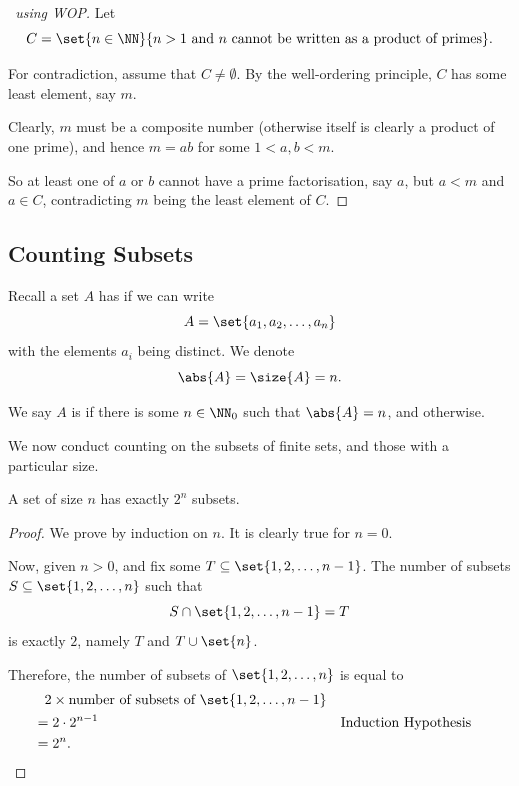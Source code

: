 \begin{proof}[\proofname\ using WOP]
    Let
    \[
        C = \set{n \in \NN}{n > 1 \text{ and } n \text{ cannot be written as a product of primes}}.
    \]

    For contradiction, assume that \(C \neq \emptyset\). By the well-ordering principle, \(C\) has some least element, say \(m\).

    Clearly, \(m\) must be a composite number (otherwise itself is clearly a product of one prime), and hence \(m = ab\) for some \(1 < a, b < m\).

    So at least one of \(a\) or \(b\) cannot have a prime factorisation, say \(a\), but \(a < m\) and \(a \in C\), contradicting \(m\) being the least element of \(C\).
\end{proof}

\subsection{Counting Subsets}
\label{sec:counting-subsets}

Recall a set \(A\) has  if we can write
\[
    A = \set{a_1, a_2, \ldots, a_n}
\]
with the elements \(a_i\) being distinct. We denote
\[
    \abs{A} = \size{A} = n.
\]

We say \(A\) is  if there is some \(n \in \NN_0\) such that \(\abs{A} = n\), and  otherwise.

We now conduct counting on the subsets of finite sets, and those with a particular size.

\begin{proposition}
    A set of size \(n\) has exactly \(2^n\) subsets.
\end{proposition}

\begin{proof}
    We prove by induction on \(n\). It is clearly true for \(n = 0\).

    Now, given \(n > 0\), and fix some \(T \subseteq \set{1, 2, \ldots, n - 1}\). The number of subsets \(S \subseteq \set{1, 2, \ldots, n}\) such that
    \[
        S \cap \set{1, 2, \ldots, n - 1} = T
    \]
    is exactly \(2\), namely \(T\) and \(T \cup \set{n}\).
    

    Therefore, the number of subsets of \(\set{1, 2, \ldots, n}\) is equal to
    \begin{align*}
        &\phantom{=} 2 \times \text{number of subsets of } \set{1, 2, \ldots, n - 1}\\
        &= 2 \cdot 2^{n - 1} && \text{Induction Hypothesis} \\
        &= 2^n.
    \end{align*}
\end{proof}

